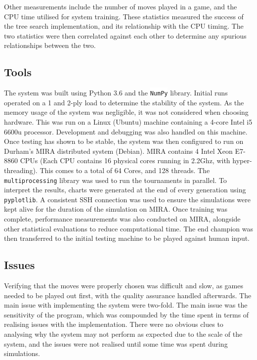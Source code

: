 \documentclass[12pt,a4paper]{article}
\newcommand{\inlinecode}[2]{\colorbox{white}{\fontsize{10}{10}\lstinline[language=#1]$#2$}}
\begin{document}
        Other measurements include the number of moves played in a game, and the CPU time utilised for system training. These statistics measured the success of the tree search implementation, and its relationship with the CPU timing. The two statistics were then correlated against each other to determine any spurious relationships between the two.

       
    \subsection{Tools}
        The system was built using Python 3.6 and the \inlinecode{Python}{NumPy} library. Initial runs operated on a 1 and 2-ply load to determine the stability of the system. As the memory usage of the system was negligible, it was not considered when choosing hardware. This was run on a Linux (Ubuntu) machine containing a 4-core Intel i5 6600u processor. Development and debugging was also handled on this machine. Once testing has shown to be stable, the system was then configured to run on Durham's MIRA distributed system (Debian). MIRA contains 4 Intel Xeon E7-8860 CPUs (Each CPU contains 16 physical cores running in 2.2Ghz, with hyper-threading). This comes to a total of 64 Cores, and 128 threads. The \inlinecode{Python}{multiprocessing} library was used to run the tournaments in parallel. To interpret the results, charts were generated at the end of every generation using \inlinecode{Python}{pyplotlib}. A consistent SSH connection was used to ensure the simulations were kept alive for the duration of the simulation on MIRA. Once training was complete, performance measurements was also conducted on MIRA, alongside other statistical evaluations to reduce computational time. The end champion was then transferred to the initial testing machine to be played against human input.



    \subsection{Issues}
        Verifying that the moves were properly chosen was difficult and slow, as games needed to be played out first, with the quality assurance handled afterwards. The main issue with implementing the system were two-fold. The main issue was the sensitivity of the program, which was compounded by the time spent in terms of realising issues with the implementation. There were no obvious clues to analysing why the system may not perform as expected due to the scale of the system, and the issues were not realised until some time was spent during simulations. 
\end{document}
